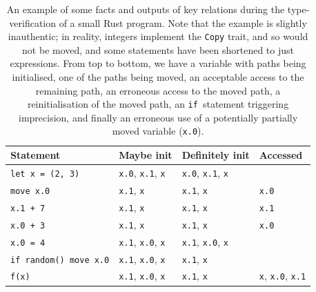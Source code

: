 \documentclass[11pt,a4paper,twoside,openany,draft]{report}
\newcommand{\InRust}[1]{\texttt{#1}}
\begin{document}
{ \renewcommand{\arraystretch}{1.0}
  \begin{table}[!htbp]    
\begin{tabular}{@{}l l l l}
  Statement                & Maybe init                 & Definitely init            & Accessed \\ \toprule
  \InRust{let x = (2, 3)} & \InRust{x.0}, \InRust{x.1}, \InRust{x} & \InRust{x.0}, \InRust{x.1}, \InRust{x} & \\
  \InRust{move x.0}        & \InRust{x.1}, \InRust{x}               & \InRust{x.1}, \InRust{x} & \InRust{x.0} \\ %
  \InRust{x.1 + 7}         & \InRust{x.1}, \InRust{x}               & \InRust{x.1}, \InRust{x} & \InRust{x.1} \\ %
  \InRust{x.0 + 3}         & \InRust{x.1}, \InRust{x}               & \InRust{x.1}, \InRust{x} & \InRust{x.0} \\ %
  \InRust{x.0 = 4}         & \InRust{x.1}, \InRust{x.0}, \InRust{x} & \InRust{x.1}, \InRust{x.0}, \InRust{x}  \\ %
  \InRust{if random() {move x.0}}  & \InRust{x.1}, \InRust{x.0}, \InRust{x} & \InRust{x.1}, \InRust{x}        \\ %
  \InRust{f(x)}  & \InRust{x.1}, \InRust{x.0}, \InRust{x} & \InRust{x.1}, \InRust{x} & \InRust{x}, \InRust{x.0}, \InRust{x.1}       \\ %
\end{tabular}
\caption[Move Error Example]{An example of some facts and outputs of key
  relations during the type-verification of a small Rust program. Note that the
  example is slightly inauthentic; in reality, integers implement the
  \InRust{Copy} trait, and so would not be moved, and some statements have been
  shortened to just expressions. From top to bottom, we have a variable with
  paths being initialised, one of the paths being moved, an acceptable access to
  the remaining path, an erroneous access to the moved path, a reinitialisation
  of the moved path, an \InRust{if}~statement triggering imprecision, and
  finally an erroneous use of a potentially partially moved variable
  (\InRust{x.0}).}\label{tab:move-example}
\end{table}%
 }
\end{document}

